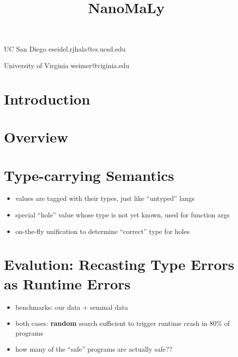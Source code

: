 \documentclass[pldi,indentedstyle=false]{sigplanconf-pldi15}
\begin{document}
%
%

\title{NanoMaLy}

           {UC San Diego}
           {{eseidel,rjhala}@cs.ucsd.edu}

           {University of Virginia}
           {weimer@viginia.edu}

\maketitle
\begin{abstract}
\end{abstract}



\section{Introduction}          %
\section{Overview}              %
\section{Type-carrying Semantics} %
\begin{itemize}
\item values are tagged with their types, just like ``untyped'' langs
\item special ``hole'' value whose type is not yet known, used for function args
\item on-the-fly unification to determine ``correct'' type for holes
\end{itemize}





\section{Evalution: Recasting Type Errors as Runtime Errors} %
\label{sec:eval-recast-type}
\begin{itemize}
\item benchmarks: our data + seminal data
\item both cases: \textbf{random} search sufficient to trigger runtime crash in 80\% of programs
\item how many of the ``safe'' programs are actually safe??
\end{itemize}
\end{document}
